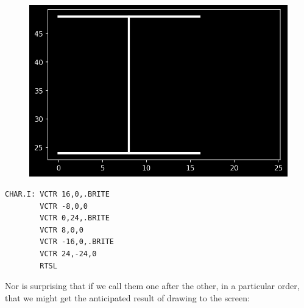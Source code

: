 \begin{minipage}[c]{0.48\linewidth}
\begin{figure}[H]
    \centering
    \begin{adjustbox}{width=4cm,center}
      \includegraphics[width=12cm]{src/literals/I.png}%
    \end{adjustbox}
\end{figure}
\end{minipage}
\begin{minipage}[c]{0.48\linewidth}
\begin{lstlisting}[basicstyle=\scriptsize\ttfamily]
CHAR.I: VCTR 16,0,.BRITE
        VCTR -8,0,0
        VCTR 0,24,.BRITE
        VCTR 8,0,0
        VCTR -16,0,.BRITE
        VCTR 24,-24,0
        RTSL
\end{lstlisting}
\vspace*{\fill}
\end{minipage}

Nor is surprising that if we call them one after the other, in a particular order, that we might get the
anticipated result of drawing  to the screen:

